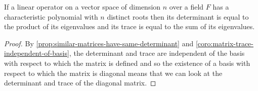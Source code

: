 \documentclass[../MathsNotesBase.tex]{subfiles}
\begin{document}
{		\bigskip{}
		\begin{corollary}\label{coro:matrix-with-eigenbasis-has-trace-equal-to-sum-of-eigenvalues-and-determinant-equal-to-product}
			If a linear operator on a vector space of dimension $n$ over a field $F$ has a characteristic polynomial with $n$ distinct roots then its determinant is equal to the product of its eigenvalues and its trace is equal to the sum of its eigenvalues.
		\end{corollary}
		\begin{proof}
			By \autoref{prop:similar-matrices-have-same-determinant} and \autoref{coro:matrix-trace-independent-of-basis}, the determinant and trace are independent of the basis with respect to which the matrix is defined and so the existence of a basis with respect to which the matrix is diagonal means that we can look at the determinant and trace of the diagonal matrix.
		\end{proof}
	
}
\end{document}
